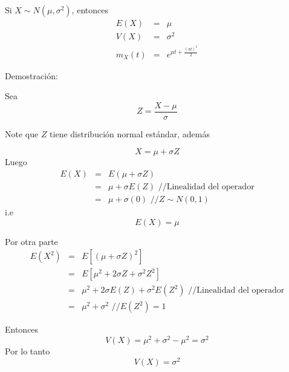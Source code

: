 \begin{i}
\begin{teorem}
Si $X\sim N(\mu ,\sigma ^{2})$, entonces
\begin{eqnarray*}
E(X) &=&\mu \\
V(X) &=&\sigma ^{2} \\
m_{X}(t) &=&e^{\mu t+\frac{(\sigma t)^{2}}{2}}
\end{eqnarray*}
\end{teorem}
Demostración:

Sea 
\begin{equation*}
Z=\frac{X-\mu }{\sigma }
\end{equation*}

Note que $Z$ tiene distribución normal estándar, además

\begin{equation*}
X=\mu +\sigma Z
\end{equation*}
Luego%
\begin{eqnarray*}
E(X) &=&E(\mu +\sigma Z) \\
&=&\mu +\sigma E(Z)\text{ //Linealidad del operador} \\
&=&\mu +\sigma (0)\text{ //}Z\sim N(0,1)
\end{eqnarray*}%
i.e
\begin{equation*}
E(X)=\mu
\end{equation*}

Por otra parte 
\begin{eqnarray*}
E(X^{2}) &=&E\left[ (\mu +\sigma Z)^{2}\right] \\
&=&E\left[ \mu ^{2}+2\sigma Z+\sigma ^{2}Z^{2}\right] \\
&=&\mu ^{2}+2\sigma E(Z)+\sigma ^{2}E(Z^{2})\text{ //Linealidad del operador}
\\
&=&\mu ^{2}+\sigma ^{2}\text{ //}E(Z^{2})=1
\end{eqnarray*}

Entonces
\begin{equation*}
V(X)=\mu ^{2}+\sigma ^{2}-\mu ^{2}=\sigma ^{2}
\end{equation*}
Por lo tanto%
\begin{equation*}
V(X)=\sigma ^{2}
\end{equation*}


\end{i}
